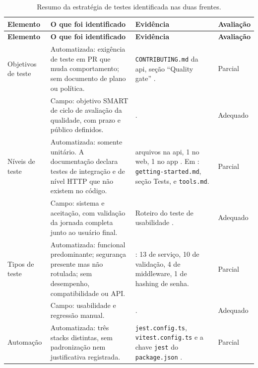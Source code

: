 {\footnotesize
\begin{longtable}{>{\raggedright\arraybackslash}p{2.1cm} >{\raggedright\arraybackslash}p{4.3cm} >{\raggedright\arraybackslash}p{4.4cm} >{\raggedright\arraybackslash}p{1.6cm}}
\caption{Resumo da estratégia de testes identificada nas duas frentes.}
\label{tab:estrategia-resumo}\\
\toprule
\textbf{Elemento} & \textbf{O que foi identificado} & \textbf{Evidência} & \textbf{Avaliação} \\
\midrule
\endfirsthead

\toprule
\textbf{Elemento} & \textbf{O que foi identificado} & \textbf{Evidência} & \textbf{Avaliação} \\
\midrule
\endhead

Objetivos de teste
& Automatizada: exigência de teste em PR que muda comportamento; sem documento de plano ou política.
& \texttt{CONTRIBUTING.md} da api, seção ``Quality gate'' \cite{educado-repos}.
& Parcial
\\[0.1cm]

& Campo: objetivo SMART de ciclo de avaliação da qualidade, com prazo e público definidos.
& \cite[p.~10]{psp5}.
& Adequado
\\
\addlinespace
Níveis de teste
& Automatizada: somente unitário. A documentação declara testes de integração e de nível HTTP que não existem no código.
& 31 arquivos na api, 1 no web, 1 no app \cite{educado-repos}. Em \cite{educado-repos}: \texttt{getting-started.md}, seção Tests, e \texttt{tools.md}.
& Parcial
\\[0.1cm]

& Campo: sistema e aceitação, com validação da jornada completa junto ao usuário final.
& Roteiro do teste de usabilidade \cite[p.~17]{psp5}.
& Adequado
\\
\addlinespace
Tipos de teste
& Automatizada: funcional predominante; segurança presente mas não rotulada; sem desempenho, compatibilidade ou API.
& \cite{educado-repos}: 13 de serviço, 10 de validação, 4 de middleware, 1 de hashing de senha.
& Parcial
\\[0.1cm]

& Campo: usabilidade e regressão manual.
& \cite{ericsson1984,brooke1996,nielsen1993,garvin1998}.
& Adequado
\\
\addlinespace
Automação
& Automatizada: três stacks distintas, sem padronização nem justificativa registrada.
& \texttt{jest.config.ts}, \texttt{vitest.config.ts} e a chave \texttt{jest} do \texttt{package.json} \cite{educado-repos}.
& Parcial
\\[0.1cm]


\end{longtable}}
